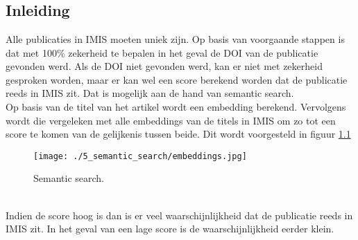 
\chapter{}%
\label{ch:semantic_search}

\section{Inleiding}
Alle publicaties in IMIS moeten uniek zijn. Op basis van voorgaande stappen is dat met 100\% zekerheid te bepalen in het geval de DOI van de publicatie gevonden werd.
Als de DOI niet gevonden werd, kan er niet met zekerheid gesproken worden, maar er kan wel een score berekend worden dat de publicatie reeds in IMIS zit. Dat is mogelijk aan de hand van semantic search.\\
Op basis van de titel van het artikel wordt een embedding berekend. Vervolgens wordt die vergeleken met alle embeddings van de titels in IMIS om zo tot een score te komen van de gelijkenis tussen beide. Dit wordt voorgesteld in figuur \ref{fig:Semanticsearch}
\begin{figure}
    \centering
    \texttt{[image: ./5\_semantic\_search/embeddings.jpg]}
    \caption[Semantic search.]{\label{fig:Semanticsearch}Semantic search.}
\end{figure}
\\
Indien de score hoog is dan is er veel waarschijnlijkheid dat de publicatie reeds in IMIS zit. In het geval van een lage score is de waarschijnlijkheid eerder klein.\\
